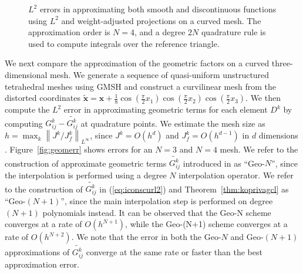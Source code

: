 \documentclass[10pt]{amsart}
\newcommand{\logLogSlopeTriangleFlip}[5]
{

    \pgfplotsextra
    {
        \pgfkeysgetvalue{/pgfplots/xmin}{\xmin}
        \pgfkeysgetvalue{/pgfplots/xmax}{\xmax}
        \pgfkeysgetvalue{/pgfplots/ymin}{\ymin}
        \pgfkeysgetvalue{/pgfplots/ymax}{\ymax}

        \pgfmathsetmacro{\xBrel}{#1-#2}
        \pgfmathsetmacro{\yBrel}{#3}
        \pgfmathsetmacro{\xCrel}{#1}

        \pgfmathsetmacro{\lnxB}{\xmin*(1-(#1-#2))+\xmax*(#1-#2)} %
        \pgfmathsetmacro{\lnxA}{\xmin*(1-#1)+\xmax*#1} %
        \pgfmathsetmacro{\lnyA}{\ymin*(1-#3)+\ymax*#3} %
        \pgfmathsetmacro{\lnyC}{\lnyA+#4*(\lnxA-\lnxB)}
        \pgfmathsetmacro{\yCrel}{\lnyC-\ymin)/(\ymax-\ymin)} %

	\pgfmathsetmacro{\xArel}{\xBrel}
        \pgfmathsetmacro{\yArel}{\yCrel}

        \coordinate (A) at (rel axis cs:\xArel,\yArel);
        \coordinate (B) at (rel axis cs:\xBrel,\yBrel);
        \coordinate (C) at (rel axis cs:\xCrel,\yCrel);

        \draw[#5]   (A)-- node[pos=0.5,anchor=east] {#4}
                    (B)-- 
                    (C)-- node[pos=0.5,anchor=south] {}
                    cycle;
    }
}
\theoremstyle{definition}
\theoremstyle{lemma}
\theoremstyle{theorem}
\theoremstyle{assumption}
\renewcommand{\hat}{\widehat}
\renewcommand{\tilde}{\widetilde}
\newcommand{\nor}[1]{\left\| #1 \right\|}
\newcommand{\LRp}[1]{\left( #1 \right)}
\newcommand{\note}[1]{{\color{blue}{#1}}}
\begin{document}
{\begin{figure}
{
}
\caption{$L^2$ errors in approximating both smooth and discontinuous functions using $L^2$ and weight-adjusted projections on a curved mesh.  The approximation order is $N=4$, and a degree $2N$ quadrature rule is used to compute integrals over the reference triangle. }
\label{fig:superconverge}
\end{figure}

We next compare the approximation of the geometric factors on a curved three-dimensional mesh.  We generate a sequence of quasi-uniform unstructured tetrahedral meshes using GMSH \cite{geuzaine2009gmsh} and construct a curvilinear mesh from the distorted coordinates $\tilde{\bm{x}} = \bm{x} + \frac{1}{8}\cos\LRp{\frac{\pi}{2}x_1}\cos\LRp{\frac{\pi}{2}x_2}\cos\LRp{\frac{\pi}{2}x_3}$.
We then compute the $L^2$ error in approximating geometric terms for each element $D^k$ by computing $G^k_{ij}-\tilde{G^k_{ij}}$ at quadrature points.  
We estimate the mesh size as $h = \max_k \nor{J^k/J^k_f}_{L^{\infty}}$, since $J^k = O(h^d)$ and $J^k_f = O(h^{d-1})$ in $d$ dimensions \cite{chan2015gpu}.  Figure~\ref{fig:geomerr} shows errors for an $N=3$ and $N=4$ mesh.  We refer to the construction of approximate geometric terms $\tilde{G^k_{ij}}$ introduced in \cite{kopriva2006metric, hindenlang2012explicit} as ``Geo-$N$'', since the interpolation is performed using a degree $N$ interpolation operator.  We refer to the construction of $\tilde{G^k_{ij}}$ in (\ref{eq:iconscurl2}) and Theorem~\ref{thm:koprivagcl} as ``Geo-$(N+1)$'', since the main interpolation step is performed on degree $(N+1)$ polynomials instead.  It can be observed that the Geo-N scheme converges at a rate of $O(h^{N+1})$, while the Geo-(N+1) scheme converges at a rate of $O(h^{N+2})$.  We note that the error in both the Geo-$N$ and Geo-$(N+1)$ approximations of $\tilde{G^k_{ij}}$ converge at the same rate or faster than the best approximation error.  

}
\end{document}
